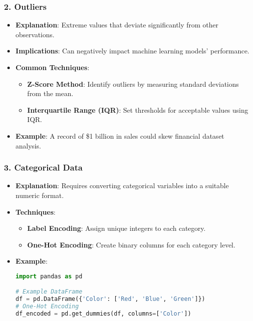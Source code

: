 \documentclass[aspectratio=169]{beamer}
\begin{document}
\begin{frame}
  \frametitle{2. Outliers}
  \begin{itemize}
    \item \textbf{Explanation}: Extreme values that deviate significantly from other observations.
    \item \textbf{Implications}: Can negatively impact machine learning models' performance.
    \item \textbf{Common Techniques}:
      \begin{itemize}
        \item \textbf{Z-Score Method}: Identify outliers by measuring standard deviations from the mean.
        \item \textbf{Interquartile Range (IQR)}: Set thresholds for acceptable values using IQR.
      \end{itemize}
    \item \textbf{Example}: A record of \$1 billion in sales could skew financial dataset analysis.
  \end{itemize}
\end{frame}

\begin{frame}
  \frametitle{3. Categorical Data}
  \begin{itemize}
    \item \textbf{Explanation}: Requires converting categorical variables into a suitable numeric format.
    \item \textbf{Techniques}:
      \begin{itemize}
        \item \textbf{Label Encoding}: Assign unique integers to each category.
        \item \textbf{One-Hot Encoding}: Create binary columns for each category level.
      \end{itemize}
    \item \textbf{Example}:
    \begin{lstlisting}[language=python]
import pandas as pd

# Example DataFrame
df = pd.DataFrame({'Color': ['Red', 'Blue', 'Green']})
# One-Hot Encoding
df_encoded = pd.get_dummies(df, columns=['Color'])
    \end{lstlisting}
  \end{itemize}
\end{frame}
\end{document}
